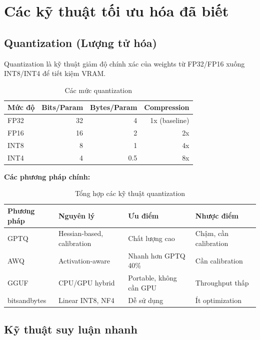 \documentclass[12pt,a4paper]{report}
\begin{document}
\section{Các kỹ thuật tối ưu hóa đã biết}

\subsection{Quantization (Lượng tử hóa)}

Quantization là kỹ thuật giảm độ chính xác của weights từ FP32/FP16 xuống INT8/INT4 để tiết kiệm VRAM.

\begin{table}[h]
\centering
\caption{Các mức quantization}
\label{tab:quant-levels}
\begin{tabular}{lrrr}
\toprule
\textbf{Mức độ} & \textbf{Bits/Param} & \textbf{Bytes/Param} & \textbf{Compression} \\
\midrule
FP32 & 32 & 4 & 1x (baseline) \\
FP16 & 16 & 2 & 2x \\
INT8 & 8 & 1 & 4x \\
INT4 & 4 & 0.5 & 8x \\
\bottomrule
\end{tabular}
\end{table}

\textbf{Các phương pháp chính:}

\begin{table}[h]
\centering
\caption{Tổng hợp các kỹ thuật quantization}
\label{tab:quant-methods}
\begin{tabular}{p{2.5cm}p{3cm}p{3cm}p{3cm}}
\toprule
\textbf{Phương pháp} & \textbf{Nguyên lý} & \textbf{Ưu điểm} & \textbf{Nhược điểm} \\
\midrule
GPTQ & Hessian-based, calibration & Chất lượng cao & Chậm, cần calibration \\
AWQ & Activation-aware & Nhanh hơn GPTQ 40\% & Cần calibration \\
GGUF & CPU/GPU hybrid & Portable, không cần GPU & Throughput thấp \\
bitsandbytes & Linear INT8, NF4 & Dễ sử dụng & Ít optimization \\
\bottomrule
\end{tabular}
\end{table}

\subsection{Kỹ thuật suy luận nhanh}
\end{document}
